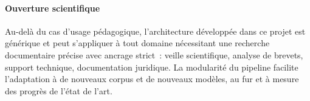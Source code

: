 \documentclass[11pt,a4paper]{article}
\begin{document}
\paragraph{Ouverture scientifique}

Au-delà du cas d'usage pédagogique, l'architecture développée dans ce projet est générique et peut s'appliquer à tout domaine nécessitant une recherche documentaire précise avec ancrage strict~: veille scientifique, analyse de brevets, support technique, documentation juridique. La modularité du pipeline facilite l'adaptation à de nouveaux corpus et de nouveaux modèles, au fur et à mesure des progrès de l'état de l'art.

\newpage
\end{document}
